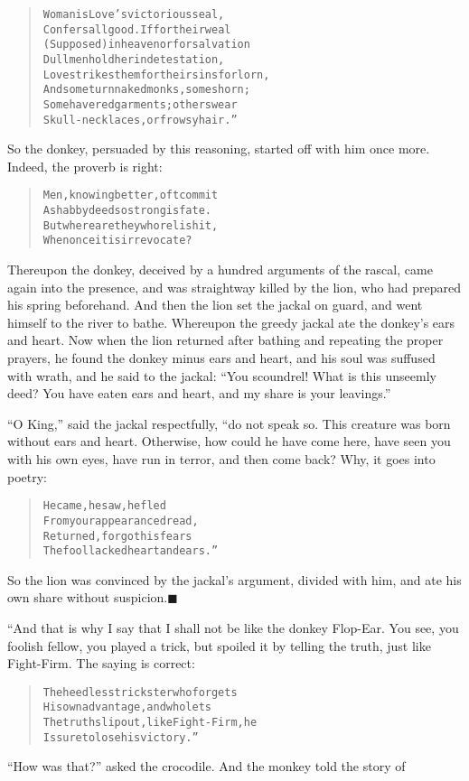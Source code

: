\documentclass[article, twoside, 14pt]{memoir}
\newcommand{\qed}{\hfill \ensuremath{\blacksquare}}
\renewenvironment{verbatim}{%
\begin{quote}%
\vskip -10pt%
\begin{alltt}\normalfont\large}{\end{alltt}%
\end{quote}%
\vskip -10pt
} %
\begin{document}
\begin{verbatim}
Woman is Love's victorious seal,
Confers all good. If for their weal
(Supposed) in heaven or for salvation
Dull men hold her in detestation,
Love strikes them for their sins forlorn,
And some turn naked monks, some shorn;
Some have red garments; others wear
Skull-necklaces, or frowsy hair.”
\end{verbatim}
So the donkey, persuaded by this reasoning, started off with him
once more. Indeed, the proverb is right:

\begin{verbatim}
Men, knowing better, oft commit
    A shabby deed{\textemdash}so strong is fate.
But where are they who relish it,
    When once it is irrevocate?
\end{verbatim}
Thereupon the donkey, deceived by a hundred arguments of the
rascal, came again into the presence, and was straightway killed by
the lion, who had prepared his spring beforehand. And then the lion
set the jackal on guard, and went himself to the river to bathe.
Whereupon the greedy jackal ate the donkey's ears and heart. Now
when the lion returned after bathing and repeating the proper
prayers, he found the donkey minus ears and heart, and his soul was
suffused with wrath, and he said to the jackal:
``You scoundrel! What is this unseemly deed? You have eaten ears and heart, and my share is your leavings.''

``O King,'' said the jackal respectfully, “do not speak so. This
creature was born without ears and heart. Otherwise, how could he
have come here, have seen you with his own eyes, have run in
terror, and then come back? Why, it goes into poetry:

\begin{verbatim}
He came, he saw, he fled
From your appearance dread,
Returned, forgot his fears{\textemdash}
The fool lacked heart and ears.”
\end{verbatim}
So the lion was convinced by the jackal's argument, divided
with him, and ate his own share without
suspicion.\hyperref[s68]{\qed}

“And that is why I say that I shall not be like the donkey
Flop-Ear. You see, you foolish fellow, you played a trick, but
spoiled it by telling the truth, just like Fight-Firm. The saying
is correct:

\begin{verbatim}
The heedless trickster who forgets
His own advantage, and who lets
The truth slip out, like Fight-Firm, he
Is sure to lose his victory.”
\end{verbatim}
``How was that?'' asked the crocodile. And the monkey told the
story of
\end{document}
